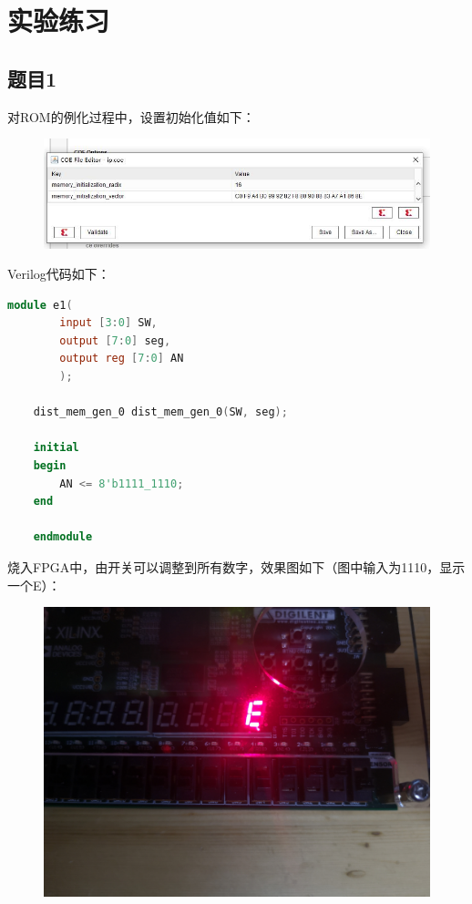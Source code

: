 \documentclass[UTF8]{article}
\begin{document}
	
	\section{实验练习}
	\subsection{题目1}
	对ROM的例化过程中，设置初始化值如下：\par
	\begin{figure}[H]
		\centering
		\includegraphics[width=1\linewidth]{e1_1.jpg}
		\label{e1_1}
	\end{figure}\par
	Verilog代码如下：
	\begin{lstlisting}[language=Verilog]
	module e1(
		input [3:0] SW,
		output [7:0] seg,
		output reg [7:0] AN
		);
	
	dist_mem_gen_0 dist_mem_gen_0(SW, seg);
	
	initial
	begin
		AN <= 8'b1111_1110;
	end
	
	endmodule
	\end{lstlisting}
	烧入FPGA中，由开关可以调整到所有数字，效果图如下（图中输入为1110，显示一个E）：\par
	\begin{figure}[H]
		\centering
		\includegraphics[width=1\linewidth]{e1_2.jpg}
		\label{e1_2}
	\end{figure}\par
	
\end{document}
